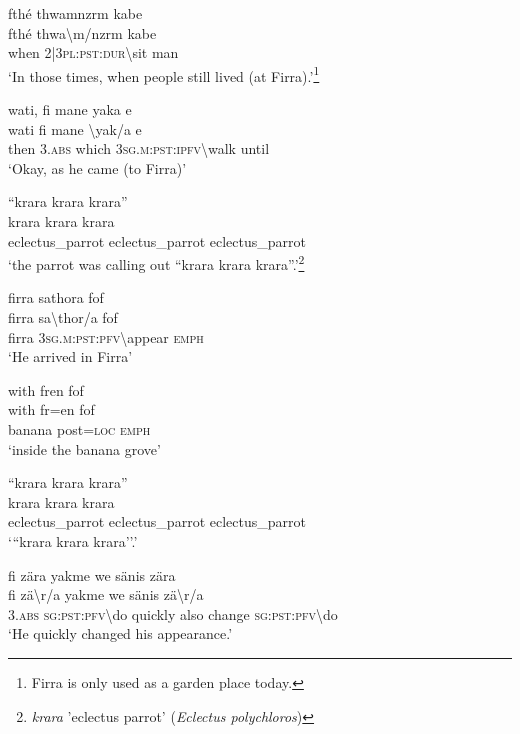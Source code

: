 \ea\label{ex:7:a4717}
fthé thwamnzrm kabe\\
\gll fthé	thwa{\textbackslash}m/nzrm	kabe\\
     when	2|3\textsc{pl}:\textsc{pst}:\textsc{dur}{\textbackslash}sit	man\\
\glt `In those times, when people still lived (at Firra).'\footnote{Firra is only used as a garden place today.}
\z

\ea\label{ex:7:a4718}
wati, fi mane yaka e\\
\gll wati	fi	mane	{\textbackslash}yak/a	e\\
     then	3.\textsc{abs}	which	3\textsc{sg}.\textsc{m}:\textsc{pst}:\textsc{ipfv}{\textbackslash}walk	until\\
\glt `Okay, as he came (to Firra)'
\z

\ea\label{ex:7:a4719}
``krara krara krara''\\
\gll krara	krara	krara\\
     eclectus\_parrot	eclectus\_parrot	eclectus\_parrot\\
\glt `the parrot was calling out ``krara krara krara''.'\footnote{\textit{krara} 'eclectus parrot' (\textit{Eclectus polychloros})}
\z

\ea\label{ex:7:a4720}
firra sathora fof\\
\gll firra	sa{\textbackslash}thor/a	fof\\
     firra	3\textsc{sg}.\textsc{m}:\textsc{pst}:\textsc{pfv}{\textbackslash}appear	\textsc{emph}\\
\glt `He arrived in Firra'
\z

\ea\label{ex:7:a4721}
with fren fof\\
\gll with	fr=en	fof\\
     banana	post=\textsc{loc}	\textsc{emph}\\
\glt `inside the banana grove'
\z

\ea\label{ex:7:a4722}
``krara krara krara''\\
\gll krara	krara	krara\\
     eclectus\_parrot	eclectus\_parrot	eclectus\_parrot\\
\glt `{``}krara krara krara''.'
\z

\ea\label{ex:7:a4723}
fi zära yakme we sänis zära\\
\gll fi	zä{\textbackslash}r/a	yakme	we	sänis	zä{\textbackslash}r/a\\
     3.\textsc{abs}	\textsc{sg}:\textsc{pst}:\textsc{pfv}{\textbackslash}do	quickly	also	change	\textsc{sg}:\textsc{pst}:\textsc{pfv}{\textbackslash}do\\
\glt `He quickly changed his appearance.'
\z

